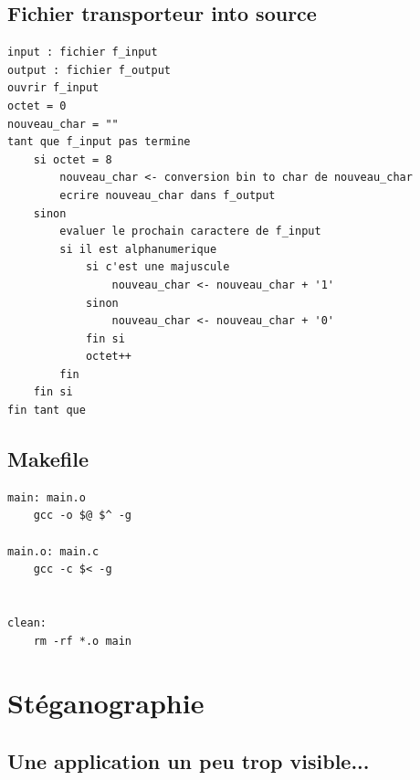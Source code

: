 \documentclass[12pt]{article}
\begin{document}
\subsection{Fichier transporteur into source}\label{pseudo_transporteur}
\begin{lstlisting}[style=pseudoCodelarge, caption=Algorithme en français de ce processus]
input : fichier f_input
output : fichier f_output
ouvrir f_input
octet = 0
nouveau_char = ""
tant que f_input pas termine
    si octet = 8
        nouveau_char <- conversion bin to char de nouveau_char
        ecrire nouveau_char dans f_output
    sinon
        evaluer le prochain caractere de f_input
        si il est alphanumerique
            si c'est une majuscule
                nouveau_char <- nouveau_char + '1'
            sinon
                nouveau_char <- nouveau_char + '0'
            fin si
            octet++
        fin
    fin si
fin tant que
\end{lstlisting}

\subsection{Makefile} 
\begin{lstlisting}[style=Makefile, caption=Makefile du projet]
main: main.o
	gcc -o $@ $^ -g

main.o: main.c
	gcc -c $< -g


clean:
	rm -rf *.o main
\end{lstlisting} 

\section{Stéganographie}
\subsection{Une application un peu trop visible...}
\end{document}
